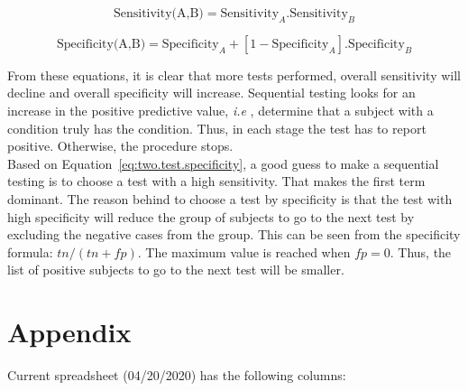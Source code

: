 \documentclass[]{article}
\begin{document}
\begin{equation}
  \mbox{Sensitivity(A,B)}  = \mbox{Sensitivity}_{A} . \mbox{Sensitivity}_{B}
\label{eq:two.test.sensitivity}
\end{equation}

\begin{equation}
  \mbox{Specificity(A,B)} =  \mbox{Specificity}_{A} + [1 - \mbox{Specificity}_{A}] . \mbox{Specificity}_{B}
\label{eq:two.test.specificity}
\end{equation}

\noindent From these equations, it is clear that more tests performed, overall sensitivity will decline 
and overall specificity will increase. Sequential testing looks for an increase in the positive 
predictive value, {\it i.e} , determine that a subject with a condition truly has the condition. 
Thus, in each stage the test has to report positive. Otherwise, the procedure stops.  \\

\noindent Based on Equation~\ref{eq:two.test.specificity}, a good guess to make a sequential testing is to choose
a test with a high sensitivity. That makes the first term dominant. The reason behind to choose a test by 
specificity is that the test with high specificity will reduce the group of subjects to go to the next test 
by excluding the negative cases from the group. This can be seen from the specificity formula: $tn/(tn+fp)$.
The maximum value is reached when $fp=0$. Thus, the list of positive subjects to go to the next test will be smaller. \\ 

\section{Appendix}

\noindent Current spreadsheet (04/20/2020) has the following columns: \\
\end{document}
